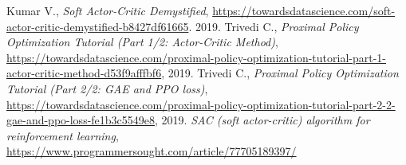 \documentclass[a4paper,12pt]{article}
\begin{document}
\begin{thebibliography}{20}
	Kumar V., \textit{Soft Actor-Critic Demystified}, \url{https://towardsdatascience.com/soft-actor-critic-demystified-b8427df61665}. 2019.
	 Trivedi C., \textit{Proximal Policy Optimization Tutorial (Part 1/2: Actor-Critic Method)}, \url{https://towardsdatascience.com/proximal-policy-optimization-tutorial-part-1-actor-critic-method-d53f9afffbf6}, 2019.
	 Trivedi C., \textit{Proximal Policy Optimization Tutorial (Part 2/2: GAE and PPO loss)}, \url{https://towardsdatascience.com/proximal-policy-optimization-tutorial-part-2-2-gae-and-ppo-loss-fe1b3c5549e8}, 2019.
	 \textit{SAC (soft actor-critic) algorithm for reinforcement learning}, \url{https://www.programmersought.com/article/77705189397/}
\end{thebibliography}
\end{document}
